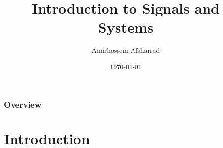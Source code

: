 \documentclass[aspectratio=169]{beamer}
\title[Signals and Systems - Tutorial \#1]{Introduction to Signals and Systems} %
\author{Amirhossein Afsharrad} %
\institute[Sharif University of Technology] %
{
Signals and Systems\\ 
Tutorial Session 1\\ 
\medskip
}
\date{\today} %
\begin{document}
\begin{frame}
\titlepage %
\end{frame}

\begin{frame}
\frametitle{Overview} %
\tableofcontents %
\end{frame}


\section{Introduction} 
\end{document}

